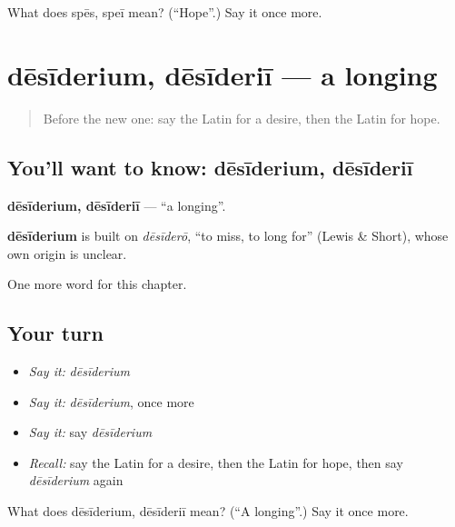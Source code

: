 \begin{tcolorbox}[breakable,colback=teal!4,colframe=teal!35!black,title={Before you move on}]
What does spēs, speī mean? (\textquotedblleft{}Hope\textquotedblright{}.) Say it once more.
\end{tcolorbox}
\section[dēsīderium, dēsīderiī]{dēsīderium, dēsīderiī — a longing}

\label{lesson:LA-C112-desiderium}



\begin{quote}
Before the new one: say the Latin for a desire, then the Latin for hope.
\end{quote}

\subsection*{You'll want to know: dēsīderium, dēsīderiī}
\textbf{dēsīderium, dēsīderiī} — \textquotedblleft{}a longing\textquotedblright{}.

\begin{cousinweb}
\textbf{dēsīderium} is built on \emph{dēsīderō}, \textquotedblleft{}to miss, to long for\textquotedblright{} (Lewis \& Short), whose own origin is unclear.
\end{cousinweb}

\begin{grammarlens}[title={What you've built}]
One more word for this chapter.
\end{grammarlens}

\subsection*{Your turn}
\begin{itemize}
\raggedright
  \item \emph{Say it:} \emph{dēsīderium}
  \item \emph{Say it:} \emph{dēsīderium}, once more
  \item \emph{Say it:} say \emph{dēsīderium}
  \item \emph{Recall:} say the Latin for a desire, then the Latin for hope, then say \emph{dēsīderium} again
\end{itemize}

\begin{tcolorbox}[breakable,colback=teal!4,colframe=teal!35!black,title={Before you move on}]
What does dēsīderium, dēsīderiī mean? (\textquotedblleft{}A longing\textquotedblright{}.) Say it once more.
\end{tcolorbox}
